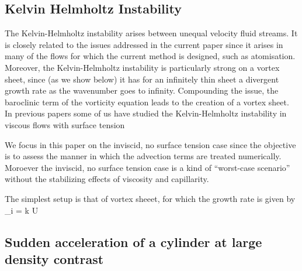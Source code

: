 \subsection{Kelvin Helmholtz Instability}

The Kelvin-Helmholtz instability arises between unequal velocity fluid
streams. It is closely related to the issues addressed in the current
paper since it arises in many of the flows for which the current
method is designed, such as atomisation. Moreover, the
Kelvin-Helmholtz instability is particularly strong on a vortex sheet,
since (as we show below) it has for an infinitely thin sheet a
divergent growth rate as the wavenumber goes to infinity. Compounding
the issue, the baroclinic term of the vorticity equation leads to the
creation of a vortex sheet. In previous papers some of us have studied the
Kelvin-Helmholtz instability in viscous flows with surface tension
\cite{yecko02,boeck05,bague10}

We focus in this paper on the inviscid, no surface tension case since the
objective is to assess the manner in which the advection terms are
treated numerically. Moroever the inviscid, no surface tension case is
a kind of ``worst-case scenario'' without the stabilizing effects of viscosity
and capillarity.

The simplest setup is that of vortex sheeet, for which the growth rate is
given by
\be
\om_i =   k U  \label{omkazi}
\nd




\subsection{Sudden acceleration of a cylinder at large density contrast}

